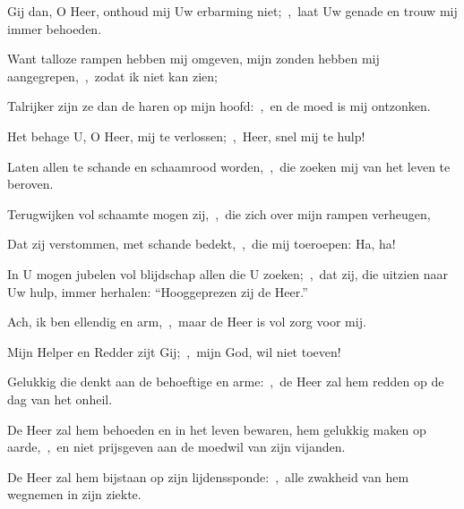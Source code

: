 \documentclass[12pt,twoside,a5paper]{article}
\begin{document}
\begin{halfparskip}
  Gij dan, O Heer, onthoud mij Uw erbarming niet;~\sep\ laat Uw genade en trouw mij immer behoeden.

  Want talloze rampen hebben mij omgeven, mijn zonden hebben mij aangegrepen,~\sep\ zodat ik niet kan zien;

  Talrijker zijn ze dan de haren op mijn hoofd:~\sep\ en de moed is mij ontzonken.

  Het behage U, O Heer, mij te verlossen;~\sep\ Heer, snel mij te hulp!

  Laten allen te schande en schaamrood worden,~\sep\ die zoeken mij van het leven te beroven.

  Terugwijken vol schaamte mogen zij,~\sep\ die zich over mijn rampen verheugen,

  Dat zij verstommen, met schande bedekt,~\sep\ die mij toeroepen: Ha, ha!

  In U mogen jubelen vol blijdschap allen die U zoeken;~\sep\ dat zij, die uitzien naar Uw hulp, immer herhalen: ``Hooggeprezen zij de Heer.''

  Ach, ik ben ellendig en arm,~\sep\ maar de Heer is vol zorg voor mij.

  Mijn Helper en Redder zijt Gij;~\sep\ mijn God, wil niet toeven!
\end{halfparskip}







\begin{halfparskip}
  Gelukkig die denkt aan de behoeftige en arme:~\sep\ de Heer zal hem redden op de dag van het onheil.


  De Heer zal hem behoeden en in het leven bewaren, hem gelukkig maken op aarde,~\sep\ en niet prijsgeven aan de moedwil van zijn vijanden.

  De Heer zal hem bijstaan op zijn lijdenssponde:~\sep\ alle zwakheid van hem wegnemen in zijn ziekte.
\end{halfparskip}
\end{document}

